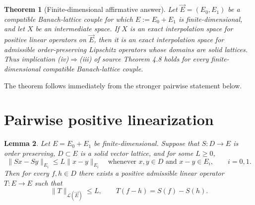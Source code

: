 \documentclass[11pt]{article}
\newtheorem{theorem}{Theorem}
\newtheorem{lemma}[theorem]{Lemma}
\newcommand{\cL}{\mathcal L}
\begin{document}
\begin{theorem}[Finite-dimensional affirmative answer]\label{thm:main}
Let $\vec E=(E_0,E_1)$ be a compatible Banach-lattice couple for which
$E:=E_0+E_1$ is finite-dimensional, and let $X$ be an intermediate space.
If $X$ is an exact interpolation space for positive linear operators on
$\vec E$, then it is an exact interpolation space for admissible
order-preserving Lipschitz operators whose domains are solid lattices.
Thus implication (iv)$\Rightarrow$(iii) of source Theorem 4.8 holds for every
finite-dimensional compatible Banach-lattice couple.
\end{theorem}

The theorem follows immediately from the stronger pairwise statement below.

\section{Pairwise positive linearization}

\begin{lemma}\label{lem:linearize}
Let $E=E_0+E_1$ be finite-dimensional.  Suppose that
$S:D\to E$ is order preserving, $D\subset E$ is a solid vector lattice, and
for some $L\ge0$,
\begin{equation}\label{eq:lip}
 \|Sx-Sy\|_{E_i}\le L\|x-y\|_{E_i}
 \quad\text{whenever }x,y\in D\text{ and }x-y\in E_i,
 \qquad i=0,1.
\end{equation}
Then for every $f,h\in D$ there exists a positive admissible linear operator
$T:E\to E$ such that
\[
 \|T\|_{\cL(\vec E)}\le L,
 \qquad T(f-h)=S(f)-S(h).
\]
\end{lemma}
\end{document}

